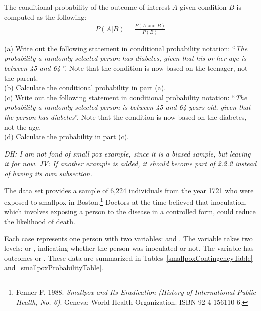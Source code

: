 \begin{doublespace}
\begin{termBox}{
The conditional probability of the outcome of interest $A$ given condition $B$ is computed as the following:
\begin{align}
P(A | B) = \frac{P(A\text{ and }B)}{P(B)}
\label{condProbEq}
\end{align}}
\end{termBox}

\begin{exercise}\label{familyCollegeProbOfParentsEqualNotGivenTeen}
(a) Write out the following statement in conditional probability notation: ``\emph{The probability a randomly selected person has diabetes, given that his or her age is between 45 and 64 }''. Note that the condition is now based on the {teenager}, not the {parent}. \\[1mm]
(b) Calculate the conditional probability in part (a). \\[1mm]
(c) Write out the following statement in conditional probability notation: ``\emph{The probability a randomly selected person is between 45 and 64 years old, given that the person has diabetes}''. Note that the condition is now based on the {diabetes}, not the {age}. \\[1mm]
(d) Calculate the probability in part (c).
\end{exercise}



\textit{DH: I am not fond of small pox example, since it is a biased sample, but leaving it for now. JV: If another example is added, it should become part of 2.2.2 instead of having its own subsection.}

The  data set provides a sample of 6,224 individuals from the year 1721 who were exposed to smallpox in Boston.\footnote{Fenner F. 1988. \emph{Smallpox and Its Eradication (History of International Public Health, No. 6)}. Geneva: World Health Organization. ISBN 92-4-156110-6.} Doctors at the time believed that inoculation, which involves exposing a person to the disease in a controlled form, could reduce the likelihood of death.

Each case represents one person with two variables:  and . The variable  takes two levels:  or , indicating whether the person was inoculated or not. The variable  has outcomes  or . These data are summarized in Tables~\ref{smallpoxContingencyTable} and~\ref{smallpoxProbabilityTable}.


\end{doublespace}

